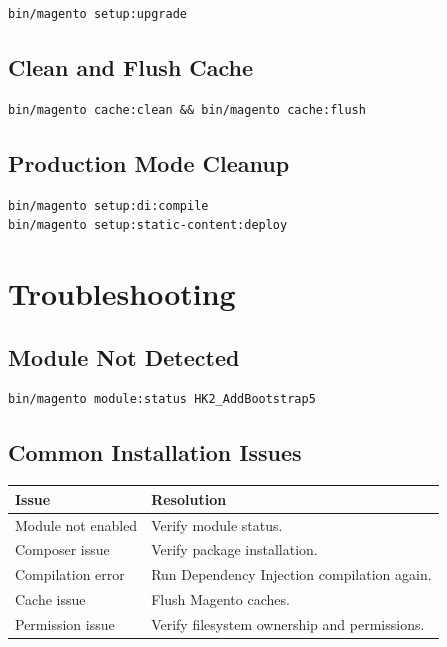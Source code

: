 \documentclass[11pt,a4paper]{article}
\begin{document}
\begin{lstlisting}[style=shell]
bin/magento setup:upgrade
\end{lstlisting}

\subsection{Clean and Flush Cache}

\begin{lstlisting}[style=shell]
bin/magento cache:clean && bin/magento cache:flush
\end{lstlisting}

\subsection{Production Mode Cleanup}

\begin{lstlisting}[style=shell]
bin/magento setup:di:compile
bin/magento setup:static-content:deploy
\end{lstlisting}

\section{Troubleshooting}

\subsection{Module Not Detected}

\begin{lstlisting}[style=shell]
bin/magento module:status HK2_AddBootstrap5
\end{lstlisting}

\subsection{Common Installation Issues}

\begin{longtable}{ll}
\toprule
\textbf{Issue} & \textbf{Resolution} \\
\midrule
\endhead
Module not enabled & Verify module status. \\
Composer issue & Verify package installation. \\
Compilation error & Run Dependency Injection compilation again. \\
Cache issue & Flush Magento caches. \\
Permission issue & Verify filesystem ownership and permissions. \\
\bottomrule
\end{longtable}
\end{document}
